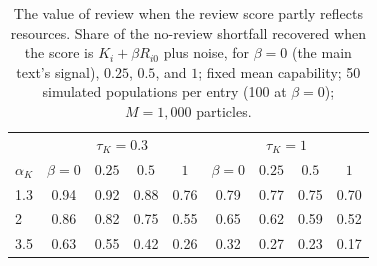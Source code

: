 \begin{table}[t]
\centering
\small
\caption{The value of review when the review score partly reflects resources. Share of the no-review shortfall recovered when the score is $K_i + \beta R_{i0}$ plus noise, for $\beta = 0$ (the main text's signal), $0.25$, $0.5$, and $1$; fixed mean capability; 50 simulated populations per entry (100 at $\beta = 0$); $M = 1{,}000$ particles.}
\label{tab:sens-contam}
\begin{tabular}{@{}lcccccccc@{}}
\toprule
& \multicolumn{4}{c}{$\tau_K = 0.3$} & \multicolumn{4}{c}{$\tau_K = 1$} \\
$\alpha_K$ & $\beta = 0$ & $0.25$ & $0.5$ & $1$ & $\beta = 0$ & $0.25$ & $0.5$ & $1$ \\
\midrule
1.3 & 0.94 & 0.92 & 0.88 & 0.76 & 0.79 & 0.77 & 0.75 & 0.70 \\
2 & 0.86 & 0.82 & 0.75 & 0.55 & 0.65 & 0.62 & 0.59 & 0.52 \\
3.5 & 0.63 & 0.55 & 0.42 & 0.26 & 0.32 & 0.27 & 0.23 & 0.17 \\
\bottomrule
\end{tabular}
\end{table}

